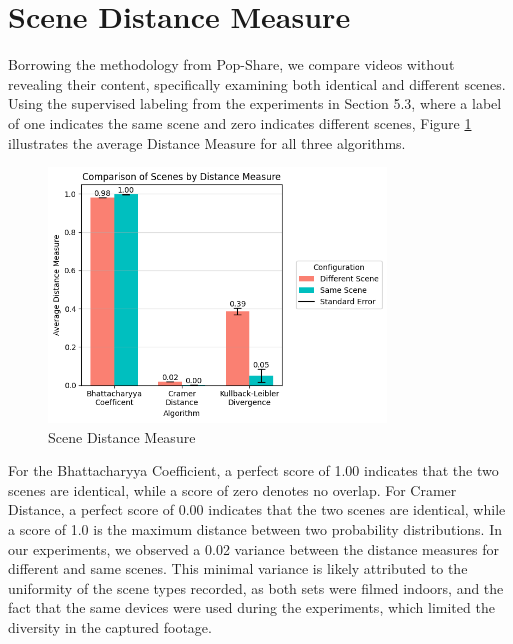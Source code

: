 \section{Scene Distance Measure}
Borrowing the methodology from Pop-Share, we compare videos without revealing their content, specifically examining both identical and different scenes. Using the supervised labeling from the experiments in Section 5.3, where a label of one indicates the same scene and zero indicates different scenes, Figure \ref{fig:scene-distance-measure} illustrates the average Distance Measure for all three algorithms. 

\begin{figure}[ht]
    \centering
    \includegraphics[width=0.8\textwidth]{5 Results/5.4 Bar Chart.png}
    \caption{Scene Distance Measure}
    \label{fig:scene-distance-measure}
\end{figure}

For the Bhattacharyya Coefficient, a perfect score of 1.00 indicates that the two scenes are identical, while a score of zero denotes no overlap. For Cramer Distance, a perfect score of 0.00 indicates that the two scenes are identical, while a score of 1.0 is the maximum distance between two probability distributions. In our experiments, we observed a 0.02 variance between the distance measures for different and same scenes. This minimal variance is likely attributed to the uniformity of the scene types recorded, as both sets were filmed indoors, and the fact that the same devices were used during the experiments, which limited the diversity in the captured footage.

